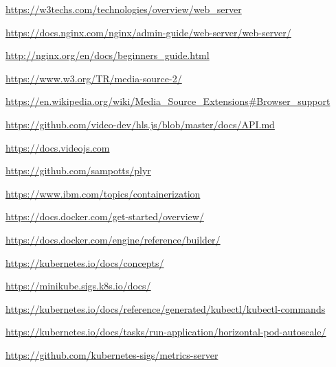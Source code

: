 \documentclass{article}
\begin{document}
\begin{thebibliography}{}
\item \url{https://w3techs.com/technologies/overview/web_server}

\item \url{https://docs.nginx.com/nginx/admin-guide/web-server/web-server/}

\item \url{http://nginx.org/en/docs/beginners_guide.html}

\item \url{https://www.w3.org/TR/media-source-2/}

\item \url{https://en.wikipedia.org/wiki/Media_Source_Extensions#Browser_support}

\item \url{https://github.com/video-dev/hls.js/blob/master/docs/API.md}

\item \url{https://docs.videojs.com}

\item \url{https://github.com/sampotts/plyr}

\item \url{https://www.ibm.com/topics/containerization}

\item \url{https://docs.docker.com/get-started/overview/}

\item \url{https://docs.docker.com/engine/reference/builder/}

\item \url{https://kubernetes.io/docs/concepts/}

\item \url{https://minikube.sigs.k8s.io/docs/}

\item \url{https://kubernetes.io/docs/reference/generated/kubectl/kubectl-commands}

\item \url{https://kubernetes.io/docs/tasks/run-application/horizontal-pod-autoscale/}

\item \url{https://github.com/kubernetes-sigs/metrics-server}

\end{thebibliography}
\end{document}
